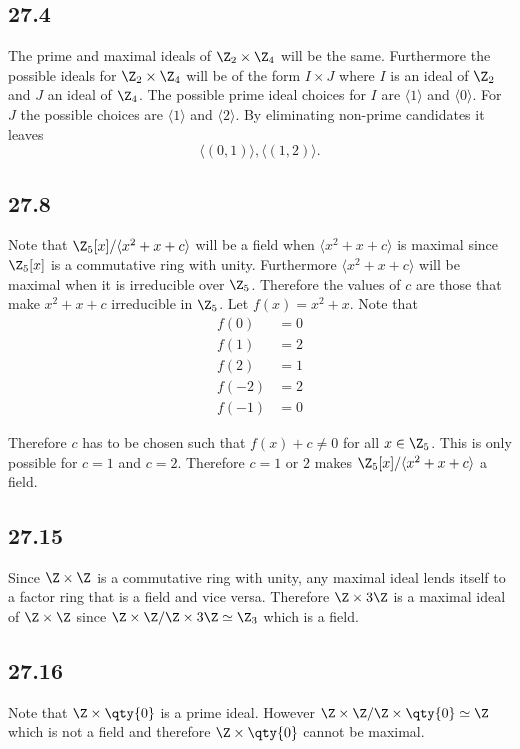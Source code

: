 \documentclass[12pt,titlepage]{extarticle}
\begin{document}
\subsection*{27.4}
The prime and maximal ideals of $\Z_2 \times \Z_4$ will be the same. Furthermore the possible ideals for $\Z_2 \times \Z_4$ will be of the form $I \times J$ where $I$ is an ideal of $\Z_2$ and $J$ an ideal of $\Z_4$. The possible prime ideal choices for $I$ are $\langle 1 \rangle$ and $\langle 0 \rangle$. For $J$ the possible choices are $\langle 1 \rangle$ and $\langle 2 \rangle$. By eliminating non-prime candidates it leaves
\[
    \langle (0,1) \rangle, \langle (1,2) \rangle
.\]

\subsection*{27.8}
Note that $\Z_5[x] / \langle x^2 + x + c \rangle$ will be a field when $\langle x^2 + x + c \rangle$ is maximal since $\Z_5[x]$ is a commutative ring with unity. Furthermore $\langle x^2 + x + c \rangle$ will be maximal when it is irreducible over $\Z_5$. Therefore the values of $c$ are those that make $x^2 + x + c$ irreducible in $\Z_5$. Let $f(x) = x^2 + x$. Note that
\begin{align*}
    f(0) &= 0 \\
    f(1) &= 2 \\
    f(2) &= 1 \\
    f(-2) &= 2 \\
    f(-1) &= 0
\end{align*}

Therefore $c$ has to be chosen such that $f(x) + c \neq 0$ for all $x \in \Z_5$. This is only possible for $c = 1$ and $c = 2$. Therefore $c = 1$ or $2$ makes $\Z_5[x] / \langle x^2 + x + c \rangle$ a field.

\subsection*{27.15}
Since $\Z \times \Z$ is a commutative ring with unity, any maximal ideal lends itself to a factor ring that is a field and vice versa. Therefore $\Z \times 3 \Z$ is a maximal ideal of $\Z \times \Z$ since $\Z \times \Z / \Z \times 3 \Z \simeq \Z_3$ which is a field.

\subsection*{27.16}
Note that $\Z \times \qty{0}$ is a prime ideal. However $\Z \times \Z / \Z \times \qty{0} \simeq \Z$ which is not a field and therefore $\Z \times \qty{0}$ cannot be maximal.
\end{document}
